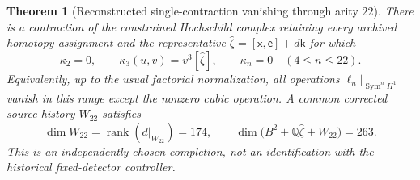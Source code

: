 \documentclass[11pt]{amsart}
\newtheorem{theorem}{Theorem}[section]
\newcommand{\rank}{\operatorname{rank}}
\newcommand{\Q}{\mathbb Q}
\begin{document}
\begin{theorem}[Reconstructed single-contraction vanishing through arity $22$]
\label{thm:independent-22}
There is a contraction of the constrained Hochschild complex retaining every
archived homotopy assignment and the representative
$\widehat\zeta=[\mathsf x,\mathsf e]+d\mathsf k$ for which
\[
\kappa_2=0,\qquad \kappa_3(u,v)=v^3[\widehat\zeta],\qquad
\kappa_n=0\quad(4\le n\le22).
\]
Equivalently, up to the usual factorial normalization, all operations
$\ell_n|_{\operatorname{Sym}^n H^1}$ vanish in this range except the nonzero
cubic operation. A common corrected source history $W_{22}$ satisfies
\[
\dim W_{22}=\rank(d|_{W_{22}})=174,
\qquad
\dim\bigl(B^2+\Q\widehat\zeta+W_{22}\bigr)=263.
\]
This is an independently chosen completion, not an identification with the
historical fixed-detector controller.
\end{theorem}
\end{document}

